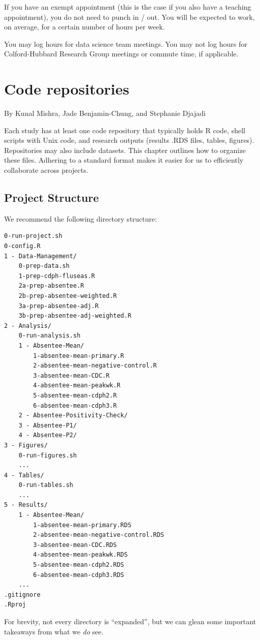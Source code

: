 \documentclass[]{book}
\begin{document}
If you have an exempt appointment (this is the case if you also have a
teaching appointment), you do not need to punch in / out. You will be
expected to work, on average, for a certain number of hours per week.

You may log hours for data science team meetings. You may not log hours
for Colford-Hubbard Research Group meetings or commute time, if
applicable.

\chapter{Code repositories}\label{code-repositories}

By Kunal Mishra, Jade Benjamin-Chung, and Stephanie Djajadi

Each study has at least one code repository that typically holds R code,
shell scripts with Unix code, and research outputs (results .RDS files,
tables, figures). Repositories may also include datasets. This chapter
outlines how to organize these files. Adhering to a standard format
makes it easier for us to efficiently collaborate across projects.

\section{Project Structure}\label{project-structure}

We recommend the following directory structure:

\begin{verbatim}
0-run-project.sh
0-config.R
1 - Data-Management/
    0-prep-data.sh
    1-prep-cdph-fluseas.R
    2a-prep-absentee.R
    2b-prep-absentee-weighted.R
    3a-prep-absentee-adj.R
    3b-prep-absentee-adj-weighted.R
2 - Analysis/
    0-run-analysis.sh
    1 - Absentee-Mean/
        1-absentee-mean-primary.R
        2-absentee-mean-negative-control.R
        3-absentee-mean-CDC.R
        4-absentee-mean-peakwk.R
        5-absentee-mean-cdph2.R
        6-absentee-mean-cdph3.R
    2 - Absentee-Positivity-Check/
    3 - Absentee-P1/
    4 - Absentee-P2/
3 - Figures/
    0-run-figures.sh
    ...
4 - Tables/
    0-run-tables.sh
    ...
5 - Results/
    1 - Absentee-Mean/
        1-absentee-mean-primary.RDS
        2-absentee-mean-negative-control.RDS
        3-absentee-mean-CDC.RDS
        4-absentee-mean-peakwk.RDS
        5-absentee-mean-cdph2.RDS
        6-absentee-mean-cdph3.RDS
    ...
.gitignore
.Rproj
\end{verbatim}

For brevity, not every directory is ``expanded'', but we can glean some
important takeaways from what we \emph{do} see.
\end{document}
